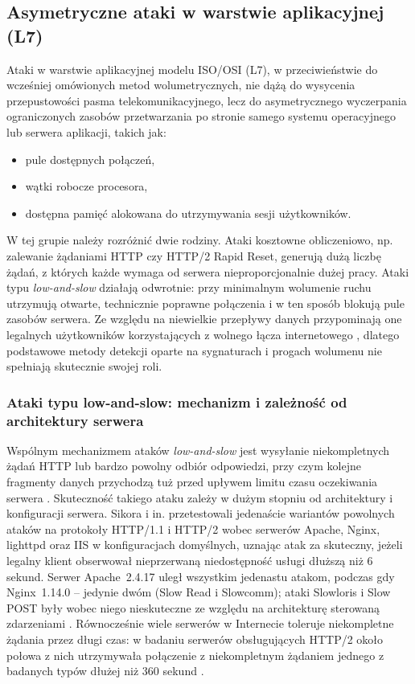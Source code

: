 \documentclass[a4paper,12pt]{article}
\begin{document}
\subsection{Asymetryczne ataki w warstwie aplikacyjnej (L7)}
Ataki w warstwie aplikacyjnej modelu ISO/OSI (L7), w przeciwieństwie do wcześniej omówionych metod wolumetrycznych, nie dążą do wysycenia przepustowości pasma telekomunikacyjnego, lecz do asymetrycznego wyczerpania ograniczonych zasobów przetwarzania po stronie samego systemu operacyjnego lub serwera aplikacji, takich jak:
\begin{itemize}
    \item pule dostępnych połączeń,
    \item wątki robocze procesora,
    \item dostępna pamięć alokowana do utrzymywania sesji użytkowników.
\end{itemize}
W tej grupie należy rozróżnić dwie rodziny. Ataki kosztowne obliczeniowo, np. zalewanie żądaniami HTTP czy HTTP/2 Rapid Reset, generują dużą liczbę żądań, z których każde wymaga od serwera nieproporcjonalnie dużej pracy. Ataki typu \textit{low-and-slow} działają odwrotnie: przy minimalnym wolumenie ruchu utrzymują otwarte, technicznie poprawne połączenia i w ten sposób blokują pule zasobów serwera. Ze względu na niewielkie przepływy danych przypominają one legalnych użytkowników korzystających z wolnego łącza internetowego \cite{sikora2021generator}, dlatego podstawowe metody detekcji oparte na sygnaturach i progach wolumenu nie spełniają skutecznie swojej roli.
\subsubsection{Ataki typu low-and-slow: mechanizm i zależność od architektury serwera}
Wspólnym mechanizmem ataków \textit{low-and-slow} jest wysyłanie niekompletnych żądań HTTP lub bardzo powolny odbiór odpowiedzi, przy czym kolejne fragmenty danych przychodzą tuż przed upływem limitu czasu oczekiwania serwera \cite{sikora2021generator}. Skuteczność takiego ataku zależy w dużym stopniu od architektury i konfiguracji serwera. Sikora i in. przetestowali jedenaście wariantów powolnych ataków na protokoły HTTP/1.1 i HTTP/2 wobec serwerów Apache, Nginx, lighttpd oraz IIS w konfiguracjach domyślnych, uznając atak za skuteczny, jeżeli legalny klient obserwował nieprzerwaną niedostępność usługi dłuższą niż 6 sekund. Serwer Apache~2.4.17 uległ wszystkim jedenastu atakom, podczas gdy Nginx~1.14.0 -- jedynie dwóm (Slow Read i Slowcomm); ataki Slowloris i Slow POST były wobec niego nieskuteczne ze względu na architekturę sterowaną zdarzeniami \cite{sikora2021generator}. Równocześnie wiele serwerów w Internecie toleruje niekompletne żądania przez długi czas: w badaniu serwerów obsługujących HTTP/2 około połowa z nich utrzymywała połączenie z niekompletnym żądaniem jednego z badanych typów dłużej niż 360 sekund \cite{tripathi2024delays}.
\end{document}
